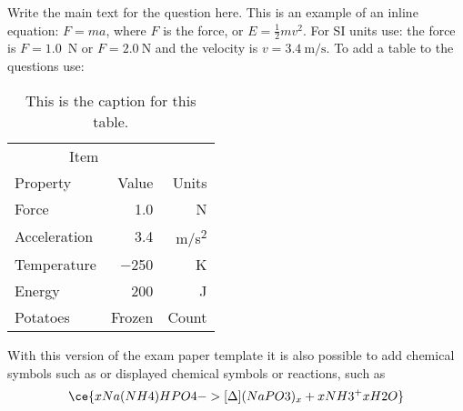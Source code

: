 \question 
Write the main text for the question here. This is an example of an inline equation: $F=ma$, where $F$ is the force, or $E=\frac{1}{2}mv^2$. For SI units use: the force is $F=1.0$~\si{N} or $F=\SI{2.0}{\newton}$ and the velocity is $v=\SI{3.4}{\meter\per\second}$. To add a table to the questions use:
%
\begin{table}[h!]
    \centering
    \label{tab:my_label}
    \caption{This is the caption for this table.}
\begin{tabular}{lrr}  
\toprule
\multicolumn{2}{c}{Item} \\
\cmidrule(r){1-2}
Property        & Value         & Units         \\ \midrule
Force           & \num{1.0}     & \si{N}        \\
Acceleration    & \num{3.4}     & \si{m/s^2}    \\
Temperature     & \num{-250}    & \si{K}        \\
Energy          & \num{200}     & \si{J}    \\
Potatoes        & Frozen        & Count         \\
\bottomrule
\end{tabular}
\addtocounter{table}{-1}
\end{table}

With this version of the exam paper template it is also possible to add chemical symbols such as  or displayed chemical symbols or reactions, such as
 \[ \ce{x Na(NH4)HPO4 ->[\Delta] (NaPO3)_x + x NH3 ^ + x H2O} \]

